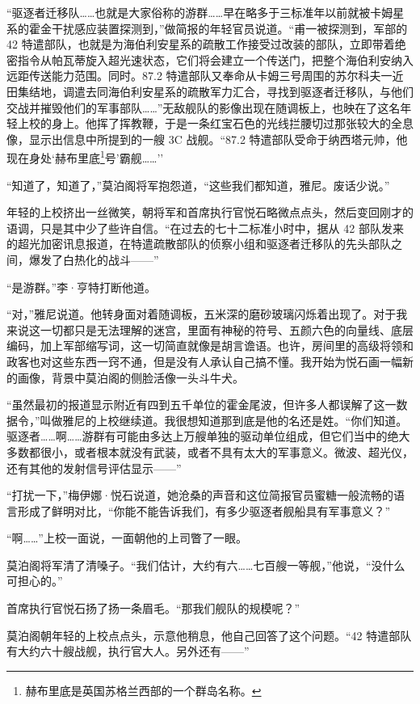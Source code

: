 \documentclass[AutoFakeBold=true]{book}
\begin{document}
\vspace*{1em}

``驱逐者迁移队……也就是大家俗称的游群……早在略多于三标准年以前就被卡姆星系的霍金干扰感应装置探测到，''做简报的年轻官员说道。``甫一被探测到，军部的 42 特遣部队，也就是为海伯利安星系的疏散工作接受过改装的部队，立即带着绝密指令从帕瓦蒂旋入超光速状态，它们将会建立一个传送门，把整个海伯利安纳入远距传送能力范围。同时。87.2 特遣部队又奉命从卡姆三号周围的苏尔科夫一近田集结地，调遣去同海伯利安星系的疏散军力汇合，寻找到驱逐者迁移队，与他们交战并摧毁他们的军事部队……''无敌舰队的影像出现在随调板上，也映在了这名年轻上校的身上。他挥了挥教鞭，于是一条红宝石色的光线拦腰切过那张较大的全息像，显示出信息中所提到的一艘 3C 战舰。``87.2 特遣部队受命于纳西塔元帅，他现在身处`赫布里底\footnote{赫布里底是英国苏格兰西部的一个群岛名称。}号'霸舰……''

``知道了，知道了，''莫泊阁将军抱怨道，``这些我们都知道，雅尼。废话少说。''

年轻的上校挤出一丝微笑，朝将军和首席执行官悦石略微点点头，然后变回刚才的语调，只是其中少了些许自信。``在过去的七十二标准小时中，据从 42 部队发来的超光加密讯息报道，在特遣疏散部队的侦察小组和驱逐者迁移队的先头部队之间，爆发了白热化的战斗——''

``是游群。''李·亨特打断他道。

``对，''雅尼说道。他转身面对着随调板，五米深的磨砂玻璃闪烁着出现了。对于我来说这一切都只是无法理解的迷宫，里面有神秘的符号、五颜六色的向量线、底层编码，加上军部缩写词，这一切简直就像是胡言谵语。也许，房间里的高级将领和政客也对这些东西一窍不通，但是没有人承认自己搞不懂。我开始为悦石画一幅新的画像，背景中莫泊阁的侧脸活像一头斗牛犬。

``虽然最初的报道显示附近有四到五千单位的霍金尾波，但许多人都误解了这一数据令，''叫做雅尼的上校继续道。我很想知道那到底是他的名还是姓。``你们知道。驱逐者……啊……游群有可能由多达上万艘单独的驱动单位组成，但它们当中的绝大多数都很小，或者根本就没有武装，或者不具有太大的军事意义。微波、超光仪，还有其他的发射信号评估显示——''

``打扰一下，''梅伊娜·悦石说道，她沧桑的声音和这位简报官员蜜糖一般流畅的语言形成了鲜明对比，``你能不能告诉我们，有多少驱逐者舰船具有军事意义？''

``啊……''上校一面说，一面朝他的上司瞥了一眼。

莫泊阁将军清了清嗓子。``我们估计，大约有六……七百艘一等舰，''他说，``没什么可担心的。''

首席执行官悦石扬了扬一条眉毛。``那我们舰队的规模呢？''

莫泊阁朝年轻的上校点点头，示意他稍息，他自己回答了这个问题。``42 特遣部队有大约六十艘战舰，执行官大人。另外还有——''
\end{document}
